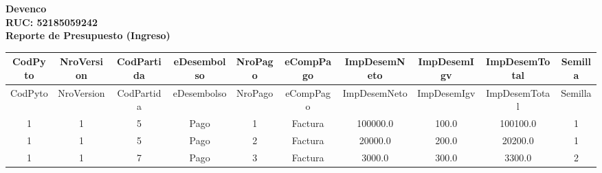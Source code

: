 \documentclass[a4paper, landscape]{article}
\begin{document}
\begin{center}
\vspace{0.5cm}
\textbf{\Huge Devenco}\\ %
\vspace{0.2cm}
\textbf{\Large RUC: 52185059242}\\ %
\vspace{1cm}
\textbf{\Large Reporte de Presupuesto (Ingreso)}
\end{center}
\vspace{1cm}
\begin{center}
\begin{longtable}{|c|c|c|c|c|c|c|c|c|c|}
\hline
CodPyto & NroVersion & CodPartida & eDesembolso & NroPago & eCompPago & ImpDesemNeto & ImpDesemIgv & ImpDesemTotal & Semilla \\
\hline
\endfirsthead
\hline
CodPyto & NroVersion & CodPartida & eDesembolso & NroPago & eCompPago & ImpDesemNeto & ImpDesemIgv & ImpDesemTotal & Semilla \\
\hline
\endhead
1 & 1 & 5 & Pago & 1 & Factura & 100000.0 & 100.0 & 100100.0 & 1 \\
1 & 1 & 5 & Pago & 2 & Factura & 20000.0 & 200.0 & 20200.0 & 1 \\
1 & 1 & 7 & Pago & 3 & Factura & 3000.0 & 300.0 & 3300.0 & 2 \\
\hline
\end{longtable}
\end{center}
\end{document}
